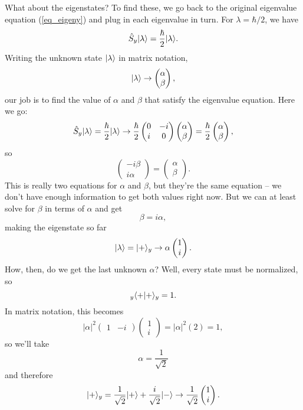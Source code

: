What about the eigenstates?  To find these, we go back to the original eigenvalue equation (\ref{eq_eigeny}) and plug in each eigenvalue in turn.  For $\lambda = \hbar/2$, we have
\[
\hat{S}_y | \lambda \rangle = \frac{\hbar}{2} | \lambda \rangle.
\]
Writing the unknown state $| \lambda \rangle$ in matrix notation,
\begin{equation}
| \lambda \rangle \to \begin{pmatrix} \alpha \\ \beta \end{pmatrix},
\end{equation}
our job is to find the value of $\alpha$ and $\beta$ that satisfy the eigenvalue equation.  Here we go:
\[
\hat{S}_y | \lambda \rangle = \frac{\hbar}{2} | \lambda \rangle \to 
\frac{\hbar}{2} \begin{pmatrix} 0 & -i \\ i & 0 \end{pmatrix} \begin{pmatrix} \alpha \\ \beta \end{pmatrix} = 
\frac{\hbar}{2}  \begin{pmatrix} \alpha \\ \beta \end{pmatrix},
\]
so
\[
\begin{pmatrix} -i \beta \\ i\alpha \end{pmatrix} =  \begin{pmatrix} \alpha \\ \beta \end{pmatrix}.
\]
This is really two equations for $\alpha$ and $\beta$, but they're the same equation -- we don't have enough information to get both values right now.  But we can at least solve for $\beta$ in terms of $\alpha$ and get
\[
\beta = i \alpha,
\]
making the eigenstate so far
\begin{equation}
| \lambda \rangle = | + \rangle_y \to \alpha \begin{pmatrix} 1 \\ i \end{pmatrix}.
\end{equation}
How, then, do we get the last unknown $\alpha$?  Well, every state must be normalized, so
\begin{equation}
_y \langle + | + \rangle_y = 1. 
\end{equation}
In matrix notation, this becomes
\[
|\alpha|^2 \begin{pmatrix} 1 & -i \end{pmatrix} \begin{pmatrix} 1 \\ i \end{pmatrix} = |\alpha|^2 (2) = 1,
\]
so we'll take
\[
\alpha = \frac{1}{\sqrt{2}}
\]
and therefore
\begin{equation}
| + \rangle_y = \frac{1}{\sqrt{2}} | + \rangle + \frac{i}{\sqrt{2}} | - \rangle \to \frac{1}{\sqrt{2}} \begin{pmatrix} 1 \\ i \end{pmatrix}.
\end{equation}

